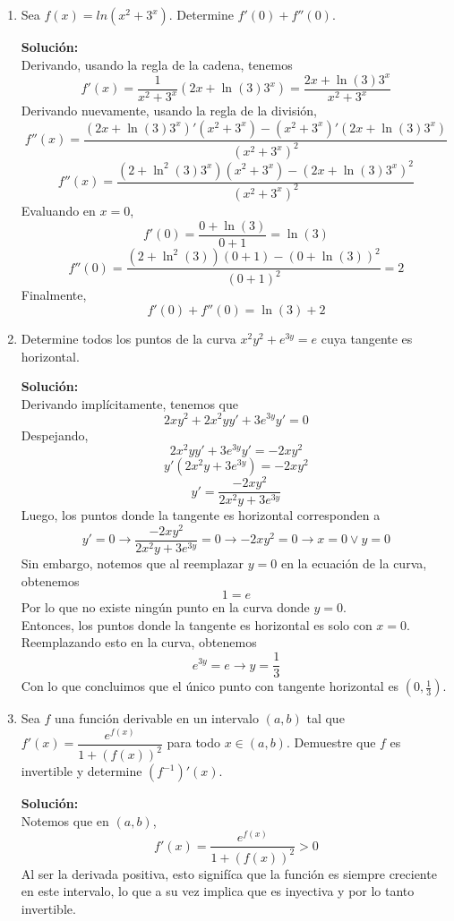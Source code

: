\documentclass[12pt]{article}
\newenvironment{solucion}
{\begin{mdframed}[backgroundcolor=black!10]
		{\bf Solución:}\\
	}
	{
	\end{mdframed}
}
\newenvironment{preguntas}
{\begin{enumerate}\itemsep12pt
	}
	{
	\end{enumerate}
}
\newcommand{\ra}{\rightarrow}
\begin{document}
\begin{preguntas}
\item Sea $f(x) = ln(x^2+3^x)$. Determine $f'(0) + f''(0)$.
\begin{solucion}
Derivando, usando la regla de la cadena, tenemos
$$f'(x) = \dfrac{1}{x^2+3^x}(2x + \ln(3)3^x) = \dfrac{2x + \ln(3)3^x}{x^2+3^x}$$
Derivando nuevamente, usando la regla de la división,
$$f''(x) = \dfrac{(2x + \ln(3)3^x)'(x^2+3^x) - (x^2+3^x)'(2x + \ln(3)3^x)}{(x^2+3^x)^2}$$
$$f''(x) = \dfrac{(2 + \ln^2(3)3^x)(x^2+3^x) - (2x + \ln(3)3^x)^2}{(x^2+3^x)^2}$$
Evaluando en $x=0$,
$$f'(0) = \dfrac{0 + \ln(3)}{0+1} = \ln(3)$$
$$f''(0) = \dfrac{(2+\ln^2(3))(0+1) - (0+\ln(3))^2}{(0+1)^2} = 2$$
Finalmente,
$$f'(0) + f''(0) = \ln(3) + 2$$
\end{solucion}
\item Determine todos los puntos de la curva $x^2y^2 + e^{3y} = e$ cuya tangente es horizontal.
\begin{solucion}
Derivando implícitamente, tenemos que
$$2xy^2 + 2x^2yy' + 3e^{3y}y' = 0$$
Despejando,
$$2x^2yy' + 3e^{3y}y' = -2xy^2$$
$$y'(2x^2y + 3e^{3y}) = -2xy^2$$
$$y' = \dfrac{-2xy^2}{2x^2y + 3e^{3y}}$$
Luego, los puntos donde la tangente es horizontal corresponden a
$$y'= 0 \ra \dfrac{-2xy^2}{2x^2y + 3e^{3y}} = 0 \ra -2xy^2 = 0 \ra x = 0 \vee y = 0$$
Sin embargo, notemos que al reemplazar $y=0$ en la ecuación de la curva, obtenemos
$$1 = e$$
Por lo que no existe ningún punto en la curva donde $y=0$.\\

Entonces, los puntos donde la tangente es horizontal es solo con $x=0$. Reemplazando esto en la curva, obtenemos
$$e^{3y} = e \ra y = \dfrac{1}{3}$$
Con lo que concluimos que el único punto con tangente horizontal es $(0,\frac{1}{3})$.
\end{solucion}
\item Sea $f$ una función derivable en un intervalo $(a,b)$ tal que $f'(x) = \dfrac{e^{f(x)}}{1+(f(x))^2}$ para todo $x \in (a,b)$. Demuestre que $f$ es invertible y determine $(f^{-1})'(x)$.
\begin{solucion}
Notemos que en $(a,b)$,
$$f'(x) = \dfrac{e^{f(x)}}{1+(f(x))^2} > 0$$
Al ser la derivada positiva, esto signifíca que la función es siempre creciente en este intervalo, lo que a su vez implica que es inyectiva y por lo tanto invertible.\\


\end{solucion}
\end{preguntas}
\end{document}
